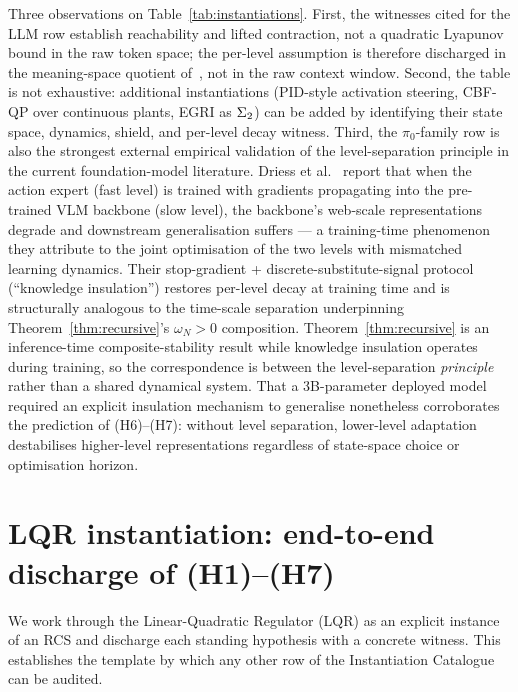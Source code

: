 \documentclass[11pt,a4paper]{article}
\begin{document}
Three observations on Table~\ref{tab:instantiations}.  First, the
witnesses cited for the LLM row establish reachability and lifted
contraction, not a quadratic Lyapunov bound in the raw token space; the
per-level assumption is therefore discharged in the meaning-space
quotient of~\cite{soatto2023taming}, not in the raw context window.
Second, the table is not exhaustive: additional instantiations
(PID-style activation steering, CBF-QP over continuous plants, EGRI as
$\Sigma_2$) can be added by identifying their state space, dynamics,
shield, and per-level decay witness.
Third, the $\pi_0$-family row is also the strongest external
empirical validation of the level-separation principle in the current
foundation-model literature.  Driess et al.~\cite{driess2025ki} report
that when the action expert (fast level) is trained with gradients
propagating into the pre-trained VLM backbone (slow level), the
backbone's web-scale representations degrade and downstream
generalisation suffers --- a training-time phenomenon they attribute
to the joint optimisation of the two levels with mismatched learning
dynamics.  Their stop-gradient + discrete-substitute-signal protocol
(``knowledge insulation'') restores per-level decay at training time
and is structurally analogous to the time-scale separation underpinning
Theorem~\ref{thm:recursive}'s $\omega_N > 0$ composition.  Theorem~\ref{thm:recursive}
is an inference-time composite-stability result while knowledge insulation operates
during training, so the correspondence is between the level-separation \emph{principle}
rather than a shared dynamical system.  That a 3B-parameter deployed model required
an explicit insulation mechanism to generalise nonetheless corroborates the
prediction of (H6)--(H7): without level separation, lower-level adaptation
destabilises higher-level representations regardless of state-space choice or
optimisation horizon.


\appendix
\section{LQR instantiation: end-to-end discharge of (H1)--(H7)}
\label{sec:app-lqr}

We work through the Linear-Quadratic Regulator (LQR) as an explicit
instance of an RCS and discharge each standing hypothesis with a
concrete witness.  This establishes the template by which any other
row of the Instantiation Catalogue can be audited.
\end{document}
